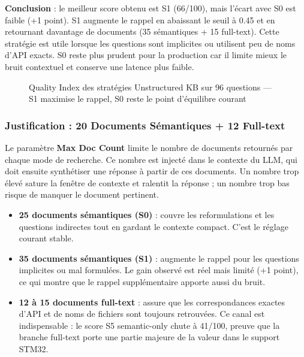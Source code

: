 \textbf{Conclusion} : le meilleur score obtenu est S1 (66/100), mais l'écart avec S0 est faible (+1 point). S1 augmente le rappel en abaissant le seuil à 0.45 et en retournant davantage de documents (35 sémantiques + 15 full-text). Cette stratégie est utile lorsque les questions sont implicites ou utilisent peu de noms d'API exacts. S0 reste plus prudent pour la production car il limite mieux le bruit contextuel et conserve une latence plus faible.

\begin{figure}[H]
\centering
{}
\caption{Quality Index des stratégies Unstructured KB sur 96 questions --- S1 maximise le rappel, S0 reste le point d'équilibre courant}
\label{fig:kb_strategy_qi}
\end{figure}

\subsubsection{Justification : 20 Documents Sémantiques + 12 Full-text}
\label{sec:max_documents}

Le paramètre \textbf{Max Doc Count} limite le nombre de documents retournés par chaque mode de recherche. Ce nombre est injecté dans le contexte du LLM, qui doit ensuite synthétiser une réponse à partir de ces documents. Un nombre trop élevé sature la fenêtre de contexte et ralentit la réponse ; un nombre trop bas risque de manquer le document pertinent.

\begin{itemize}
  \item \textbf{25 documents sémantiques (S0)} : couvre les reformulations et les questions indirectes tout en gardant le contexte compact. C'est le réglage courant stable.
  \item \textbf{35 documents sémantiques (S1)} : augmente le rappel pour les questions implicites ou mal formulées. Le gain observé est réel mais limité (+1 point), ce qui montre que le rappel supplémentaire apporte aussi du bruit.
  \item \textbf{12 à 15 documents full-text} : assure que les correspondances exactes d'API et de noms de fichiers sont toujours retrouvées. Ce canal est indispensable : le score S5 semantic-only chute à 41/100, preuve que la branche full-text porte une partie majeure de la valeur dans le support STM32.
\end{itemize}

